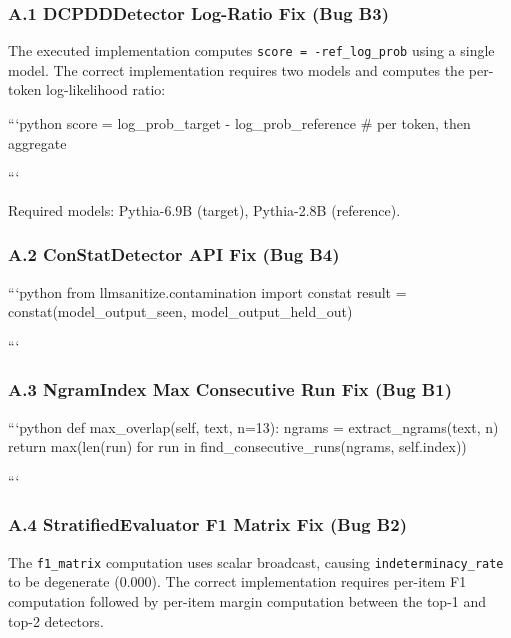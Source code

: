 
\subsubsection{A.1 DCPDDDetector Log-Ratio Fix (Bug B3)}

The executed implementation computes \texttt{score = -ref_log_prob} using a single model. The correct implementation requires two models and computes the per-token log-likelihood ratio:

```python
score = log_prob_target - log_prob_reference  \# per token, then aggregate

```

Required models: Pythia-6.9B (target), Pythia-2.8B (reference).

\subsubsection{A.2 ConStatDetector API Fix (Bug B4)}

```python
from llmsanitize.contamination import constat
result = constat(model_output_seen, model_output_held_out)

```

\subsubsection{A.3 NgramIndex Max Consecutive Run Fix (Bug B1)}

```python
def max_overlap(self, text, n=13):
    ngrams = extract_ngrams(text, n)
    return max(len(run) for run in find_consecutive_runs(ngrams, self.index))

```

\subsubsection{A.4 StratifiedEvaluator F1 Matrix Fix (Bug B2)}

The \texttt{f1_matrix} computation uses scalar broadcast, causing \texttt{indeterminacy_rate} to be degenerate (0.000). The correct implementation requires per-item F1 computation followed by per-item margin computation between the top-1 and top-2 detectors.

